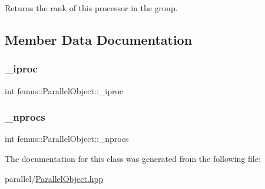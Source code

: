 \begin{DoxyReturn}{Returns}
the rank of this processor in the group. 
\end{DoxyReturn}


\subsection{Member Data Documentation}
\mbox{\label{classfemus_1_1_parallel_object_a15b46748a2e26bc263e3e6e4690e8a3b}} 
\subsubsection{\texorpdfstring{\+\_\+iproc}{\_iproc}}
{\footnotesize\ttfamily int femus\+::\+Parallel\+Object\+::\+\_\+iproc\hspace{0.3cm}{\ttfamily [protected]}}

\mbox{\label{classfemus_1_1_parallel_object_a0ee45f5bc96766fa25c736a40674e551}} 
\subsubsection{\texorpdfstring{\+\_\+nprocs}{\_nprocs}}
{\footnotesize\ttfamily int femus\+::\+Parallel\+Object\+::\+\_\+nprocs\hspace{0.3cm}{\ttfamily [protected]}}



The documentation for this class was generated from the following file\+:\begin{DoxyCompactItemize}
\item 
parallel/\mbox{\hyperlink{_parallel_object_8hpp}{Parallel\+Object.\+hpp}}\end{DoxyCompactItemize}
